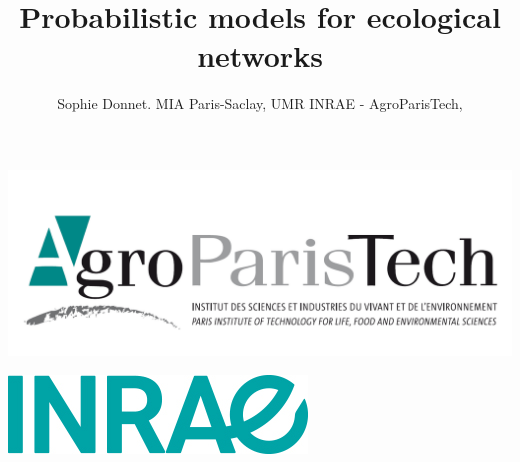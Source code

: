 \documentclass[compress,10pt]{beamer}
\title{Probabilistic models for  ecological networks}%
\author{Sophie  Donnet.  MIA Paris-Saclay, UMR  INRAE - AgroParisTech,  }
\date{}
\begin{document}

\begin{frame}
\titlepage

\vspace{-.5cm}
\includegraphics[scale=.1]{plots/AgroParisTech_-_logo.PNG}
\vspace{-1.2cm}
\begin{flushright}
 \includegraphics[scale=.3]{plots/Logo-INRAE.jpg}
 \end{flushright}

\end{frame}


\end{document}
